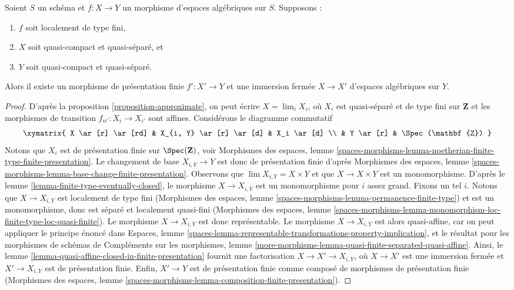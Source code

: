 \begin{lemma}
\label{lemma-finite-type-closed-in-finite-presentation}
Soient $S$ un schéma et $f : X \to Y$ un morphisme d'espaces algébriques
sur $S$. Supposons :
\begin{enumerate}
\item $f$ soit localement de type fini,
\item $X$ soit quasi-compact et quasi-séparé, et
\item $Y$ soit quasi-compact et quasi-séparé.
\end{enumerate}
Alors il existe un morphisme de présentation finie
$f' : X' \to Y$ et une immersion fermée $X \to X'$ d'espaces
algébriques sur $Y$.
\end{lemma}

\begin{proof}
D'après la proposition \ref{proposition-approximate},
on peut écrire $X = \lim_i X_i$, où $X_i$ est quasi-séparé et de type fini sur
$\mathbf{Z}$ et les morphismes de transition $f_{ii'} : X_i \to X_{i'}$ sont affines.
Considérons le diagramme commutatif
$$
\xymatrix{
X \ar[r] \ar[rd] & X_{i, Y} \ar[r] \ar[d] & X_i \ar[d] \\
& Y \ar[r] & \Spec(\mathbf{Z})
}
$$
Notons que $X_i$ est de présentation finie sur $\Spec(\mathbf{Z})$, voir
Morphismes des espaces, lemme
\ref{spaces-morphisms-lemma-noetherian-finite-type-finite-presentation}.
Le changement de base $X_{i, Y} \to Y$ est donc de présentation finie d'après
Morphismes des espaces, lemme
\ref{spaces-morphisms-lemma-base-change-finite-presentation}.
Observons que $\lim X_{i, Y} = X \times Y$ et que $X \to X \times Y$ est un
monomorphisme. D'après le lemme \ref{lemma-finite-type-eventually-closed},
le morphisme $X \to X_{i, Y}$ est un monomorphisme pour $i$ assez grand.
Fixons un tel $i$. Notons que $X \to X_{i, Y}$ est localement de type fini
(Morphismes des espaces, lemme
\ref{spaces-morphisms-lemma-permanence-finite-type})
et est un monomorphisme, donc est séparé et localement quasi-fini
(Morphismes des espaces, lemme
\ref{spaces-morphisms-lemma-monomorphism-loc-finite-type-loc-quasi-finite}).
Le morphisme $X \to X_{i, Y}$ est donc représentable.
Le morphisme $X \to X_{i, Y}$ est alors quasi-affine, car on peut appliquer le
principe énoncé dans Espaces, lemme
\ref{spaces-lemma-representable-transformations-property-implication},
et le résultat pour les morphismes de schémas de Compléments sur les morphismes, lemme
\ref{more-morphisms-lemma-quasi-finite-separated-quasi-affine}.
Ainsi, le lemme \ref{lemma-quasi-affine-closed-in-finite-presentation}
fournit une factorisation $X \to X' \to X_{i, Y}$,
où $X \to X'$ est une immersion fermée et $X' \to X_{i, Y}$ est de
présentation finie. Enfin, $X' \to Y$ est de présentation finie comme
composé de morphismes de présentation finie
(Morphismes des espaces, lemme
\ref{spaces-morphisms-lemma-composition-finite-presentation}).
\end{proof}


